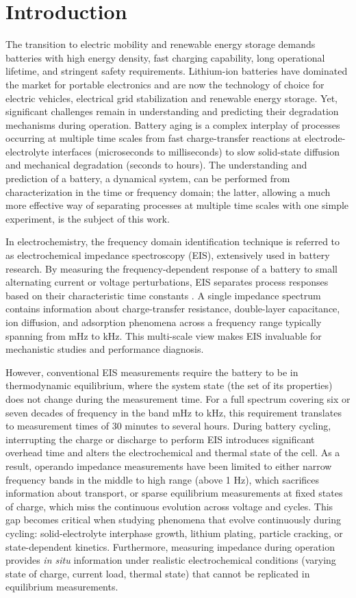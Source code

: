 \chapter{Introduction}

The transition to electric mobility and renewable energy storage demands batteries with high energy density, fast charging capability, long operational lifetime, and stringent safety requirements. Lithium-ion batteries have dominated the market for portable electronics and are now the technology of choice for electric vehicles, electrical grid stabilization and renewable energy storage. Yet, significant challenges remain in understanding and predicting their degradation mechanisms during operation. Battery aging is a complex interplay of processes occurring at multiple time scales from fast charge-transfer reactions at electrode-electrolyte interfaces (microseconds to milliseconds) to slow solid-state diffusion and mechanical degradation (seconds to hours). The understanding and prediction of a battery, a dynamical system, can be performed from characterization in the time or frequency domain; the latter, allowing a much more effective way of separating processes at multiple time scales with one simple experiment, is the subject of this work.

In electrochemistry, the frequency domain identification technique is referred to as electrochemical impedance spectroscopy (EIS), extensively used in battery research. By measuring the frequency-dependent response of a battery to small alternating current or voltage perturbations, EIS separates process responses based on their characteristic time constants \cite{orazemEIS}. A single impedance spectrum contains information about charge-transfer resistance, double-layer capacitance, ion diffusion, and adsorption phenomena across a frequency range typically spanning from mHz to kHz. This multi-scale view makes EIS invaluable for mechanistic studies and performance diagnosis.

However, conventional EIS measurements require the battery to be in thermodynamic equilibrium, where the system state (the set of its properties) does not change during the measurement time. For a full spectrum covering six or seven decades of frequency in the band mHz to kHz, this requirement translates to measurement times of 30 minutes to several hours. During battery cycling, interrupting the charge or discharge to perform EIS introduces significant overhead time and alters the electrochemical and thermal state of the cell. As a result, operando impedance measurements have been limited to either narrow frequency bands in the middle to high range (above 1 Hz), which sacrifices information about transport, or sparse equilibrium measurements at fixed states of charge, which miss the continuous evolution across voltage and cycles. This gap becomes critical when studying phenomena that evolve continuously during cycling: solid-electrolyte interphase growth, lithium plating, particle cracking, or state-dependent kinetics. Furthermore, measuring impedance during operation provides \emph{in situ} information under realistic electrochemical conditions (varying state of charge, current load, thermal state) that cannot be replicated in equilibrium measurements.

